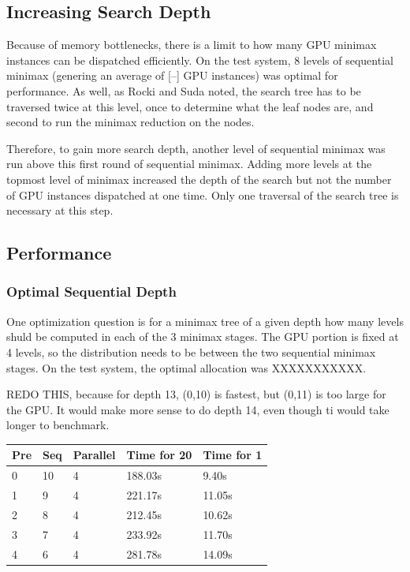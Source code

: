 \documentclass{article}
\begin{document}
\subsection{Increasing Search Depth}
Because of memory bottlenecks, there is a limit to how many GPU minimax instances can be dispatched efficiently. On the test system, 8 levels of sequential minimax (genering an average of [--] GPU instances) was optimal for performance. As well, as Rocki and Suda\cite{rockisuda10} noted, the search tree has to be traversed twice at this level, once to determine what the leaf nodes are, and second to run the minimax reduction on the nodes.

Therefore, to gain more search depth, another level of sequential minimax was run above this first round of sequential minimax. Adding more levels at the topmost level of minimax increased the depth of the search but not the number of GPU instances dispatched at one time. Only one traversal of the search tree is necessary at this step.

\subsection{Performance}
\subsubsection{Optimal Sequential Depth}
One optimization question is for a minimax tree of a given depth how many levels shuld be computed in each of the 3 minimax stages. The GPU portion is fixed at 4 levels, so the distribution needs to be between the two sequential minimax stages. On the test system, the optimal allocation was XXXXXXXXXXX.

REDO THIS, because for depth 13, (0,10) is fastest, but (0,11) is too large for the GPU. It would make more sense to do depth 14, even though ti would take longer to benchmark.

\begin{tabular}{| l | l | l | l | l |}
  \hline
  Pre & Seq & Parallel & Time for 20 & Time for 1 \\
  \hline
  0 & 10 & 4 & 188.03s & 9.40s \\
  1 & 9 & 4 & 221.17s & 11.05s \\ 
  2 & 8 & 4 & 212.45s & 10.62s \\
  3 & 7 & 4 & 233.92s & 11.70s \\ 
  4 & 6 & 4 & 281.78s & 14.09s \\
  \hline
\end{tabular}
\end{document}
